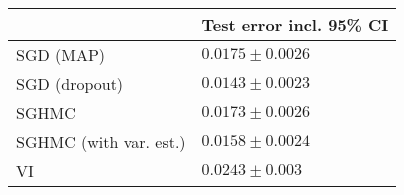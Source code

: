 \begin{tabular}{ll}
\toprule
{} & Test error incl. 95\% CI \\
\midrule
SGD (MAP)              &      $0.0175 \pm 0.0026$ \\
SGD (dropout)          &      $0.0143 \pm 0.0023$ \\
SGHMC                  &      $0.0173 \pm 0.0026$ \\
SGHMC (with var. est.) &      $0.0158 \pm 0.0024$ \\
VI                     &       $0.0243 \pm 0.003$ \\
\bottomrule
\end{tabular}
